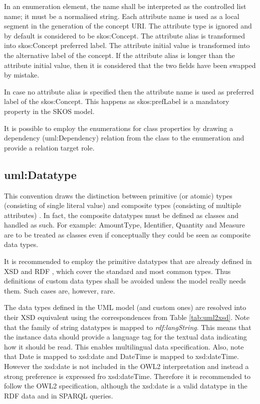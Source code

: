 	In an enumeration element, the name shall be interpreted as the controlled list name; it must be a normalised string. Each attribute name is used as a local segment in the generation of the concept URI. The attribute type is ignored and by default is considered to be skos:Concept. The attribute alias is transformed into skos:Concept preferred label. The attribute initial value is transformed into the alternative label of the concept. If the attribute alias is longer than the attribute initial value, then it is considered that the two fields have been swapped by mistake. 
	
	In case no attribute alias is specified then the attribute name is used as preferred label of the skos:Concept. This happens as skos:prefLabel is a mandatory property in the SKOS model.
	
	It is possible to employ the enumerations for class properties by drawing a dependency (uml:Dependency) relation from the class to the
	enumeration and provide a relation target role.
	

	\subsection{uml:Datatype}
	\label{sec:datatype}
	
	This convention draws the distinction between primitive (or atomic) types (consisting of single literal value) and composite types (consisting of multiple attributes) \citep{isaHandbook2015}. In fact, the composite datatypes must be defined as classes and handled as such. For example: AmountType, Identifier, Quantity and Measure are to be treated as classes even if conceptually they could be seen as composite data types.
	
	It is recommended to employ the primitive datatypes that are already defined in XSD \cite{xsd1.1-spec} and RDF \cite{rdf11}, which cover the standard and most common types. Thus definitions of custom data types shall be avoided unless the model really needs them. Such cases are, however, rare.
	
	The data types defined in the UML model (and custom ones) are resolved into their XSD equivalent using the correspondences from Table \ref{tab:uml2xsd}. Note that the family of string datatypes is mapped to \textit{rdf:langString}. This means that the instance data should provide a language tag for the textual data indicating how it should be read. This enables multilingual data specification. Also, note that Date is mapped to xsd:date and DateTime is mapped to xsd:dateTime. However the xsd:date is not included in the OWL2 interpretation and instead a strong preference is expressed fro xsd:dateTime. Therefore it is recommended to follow the OWL2 specification, although the xsd:date is a valid datatype in the RDF data and in SPARQL queries. 
	
